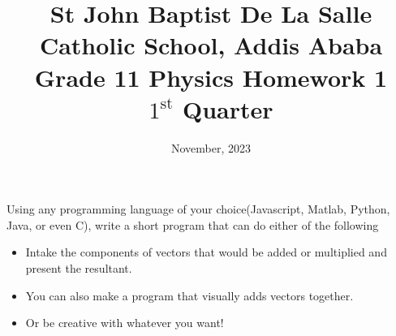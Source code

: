 \documentclass[12pt,addpoints]{exam}
\date{November, 2023}
\begin{document}
	\title{St John Baptist De La Salle Catholic School, Addis Ababa\\
		\large Grade 11 Physics Homework 1\\
		$1^\text{st}$ Quarter}
	\maketitle
	\begin{questions}
		\question Using any programming language of your choice(Javascript, Matlab, Python, Java, or even C), write a short program that can do either of the following
		\begin{itemize}
			\item Intake the components of vectors that would be added or multiplied and present the resultant.
			\item You can also make a program that visually adds vectors together.
			\item Or be creative with whatever you want!
		\end{itemize}
		
	\end{questions}	
\end{document}
